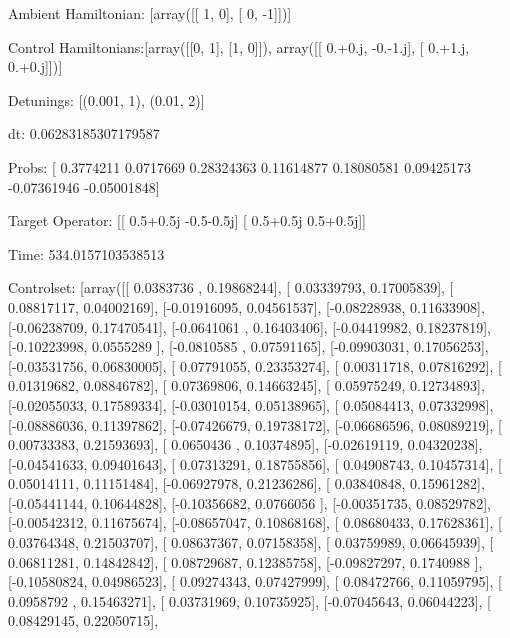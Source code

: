 \documentclass{article}
\begin{document}
    

\newpage

Ambient Hamiltonian: [array([[ 1,  0],
       [ 0, -1]])]

Control Hamiltonians:[array([[0, 1],
       [1, 0]]), array([[ 0.+0.j, -0.-1.j],
       [ 0.+1.j,  0.+0.j]])]

Detunings: [(0.001, 1), (0.01, 2)]

 dt: 0.06283185307179587

Probs: [ 0.3774211   0.0717669   0.28324363  0.11614877  0.18080581  0.09425173
 -0.07361946 -0.05001848]

Target Operator: [[ 0.5+0.5j -0.5-0.5j]
 [ 0.5+0.5j  0.5+0.5j]]

Time: 534.0157103538513

Controlset: [array([[ 0.0383736 ,  0.19868244],
       [ 0.03339793,  0.17005839],
       [ 0.08817117,  0.04002169],
       [-0.01916095,  0.04561537],
       [-0.08228938,  0.11633908],
       [-0.06238709,  0.17470541],
       [-0.0641061 ,  0.16403406],
       [-0.04419982,  0.18237819],
       [-0.10223998,  0.0555289 ],
       [-0.0810585 ,  0.07591165],
       [-0.09903031,  0.17056253],
       [-0.03531756,  0.06830005],
       [ 0.07791055,  0.23353274],
       [ 0.00311718,  0.07816292],
       [ 0.01319682,  0.08846782],
       [ 0.07369806,  0.14663245],
       [ 0.05975249,  0.12734893],
       [-0.02055033,  0.17589334],
       [-0.03010154,  0.05138965],
       [ 0.05084413,  0.07332998],
       [-0.08886036,  0.11397862],
       [-0.07426679,  0.19738172],
       [-0.06686596,  0.08089219],
       [ 0.00733383,  0.21593693],
       [ 0.0650436 ,  0.10374895],
       [-0.02619119,  0.04320238],
       [-0.04541633,  0.09401643],
       [ 0.07313291,  0.18755856],
       [ 0.04908743,  0.10457314],
       [ 0.05014111,  0.11151484],
       [-0.06927978,  0.21236286],
       [ 0.03840848,  0.15961282],
       [-0.05441144,  0.10644828],
       [-0.10356682,  0.0766056 ],
       [-0.00351735,  0.08529782],
       [-0.00542312,  0.11675674],
       [-0.08657047,  0.10868168],
       [ 0.08680433,  0.17628361],
       [ 0.03764348,  0.21503707],
       [ 0.08637367,  0.07158358],
       [ 0.03759989,  0.06645939],
       [ 0.06811281,  0.14842842],
       [ 0.08729687,  0.12385758],
       [-0.09827297,  0.1740988 ],
       [-0.10580824,  0.04986523],
       [ 0.09274343,  0.07427999],
       [ 0.08472766,  0.11059795],
       [ 0.0958792 ,  0.15463271],
       [ 0.03731969,  0.10735925],
       [-0.07045643,  0.06044223],
       [ 0.08429145,  0.22050715],
\end{document}
